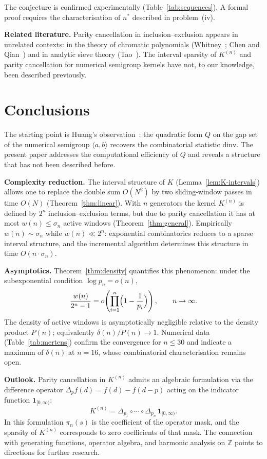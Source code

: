 \documentclass[11pt,a4paper]{amsart}
\theoremstyle{plain}
\theoremstyle{definition}
\theoremstyle{remark}
\begin{document}
The conjecture is confirmed experimentally
(Table~\ref{tab:sequences}).
A formal proof requires the characterisation of $n^*$
described in problem~(iv).

\medskip
\textbf{Related literature.}
Parity cancellation in inclusion--exclusion appears in unrelated contexts:
in the theory of chromatic polynomials
(Whitney~\cite{Whitney1932}; Chen and Qian~\cite{ChenQian2018})
and in analytic sieve theory
(Tao~\cite{Tao2007}).
The interval sparsity of $K^{(n)}$ and parity cancellation
for numerical semigroup kernels have not, to our knowledge,
been described previously.

\section{Conclusions}
\label{sec:conclusion}

The starting point is Huang's observation~\cite{Huang2026}:
the quadratic form $Q$ on the gap set of the numerical semigroup
$\langle a, b \rangle$ recovers the combinatorial statistic $\mathrm{dinv}$.
The present paper addresses the computational efficiency of $Q$
and reveals a structure that has not been described before.

\textbf{Complexity reduction.}
The interval structure of $K$ (Lemma~\ref{lem:K-intervals})
allows one to replace the double sum $O(N^2)$ by two sliding-window
passes in time $O(N)$ (Theorem~\ref{thm:linear}).
With $n$ generators the kernel $K^{(n)}$ is defined by
$2^n$ inclusion--exclusion terms, but due to parity cancellation
it has at most $w(n) \leq \sigma_n$ active windows
(Theorem~\ref{thm:general}).
Empirically $w(n) \sim \sigma_n$ while $w(n) \ll 2^n$:
exponential combinatorics reduces to a sparse interval structure,
and the incremental algorithm determines this structure in time
$O(n \cdot \sigma_n)$.

\textbf{Asymptotics.}
Theorem~\ref{thm:density} quantifies this phenomenon:
under the subexponential condition $\log p_n = o(n)$,
\[
  \frac{w(n)}{2^n - 1} = o\!\left(\prod_{i=1}^n
    \Bigl(1 - \frac{1}{p_i}\Bigr)\right), \qquad n \to \infty.
\]
The density of active windows is asymptotically negligible
relative to the density product $P(n)$; equivalently $\delta(n)/P(n) \to 1$.
Numerical data (Table~\ref{tab:mertens}) confirm the convergence
for $n \leq 30$ and indicate a maximum of $\delta(n)$ at $n = 16$,
whose combinatorial characterisation remains open.

\textbf{Outlook.}
Parity cancellation in $K^{(n)}$ admits an algebraic formulation
via the difference operator
$\Delta_{p} f(d) = f(d) - f(d - p)$
acting on the indicator function $\mathbf{1}_{[0,\infty)}$:
\[
  K^{(n)} = \Delta_{p_1} \circ \cdots \circ \Delta_{p_n}\,
             \mathbf{1}_{[0,\infty)}.
\]
In this formulation $\pi_n(s)$ is the coefficient of the operator
mask, and the sparsity of $K^{(n)}$ corresponds to zero coefficients
of that mask. The connection with generating functions, operator
algebra, and harmonic analysis on $\mathbb{Z}$ points to directions
for further research.


\clearpage
\printbibliography
\end{document}

